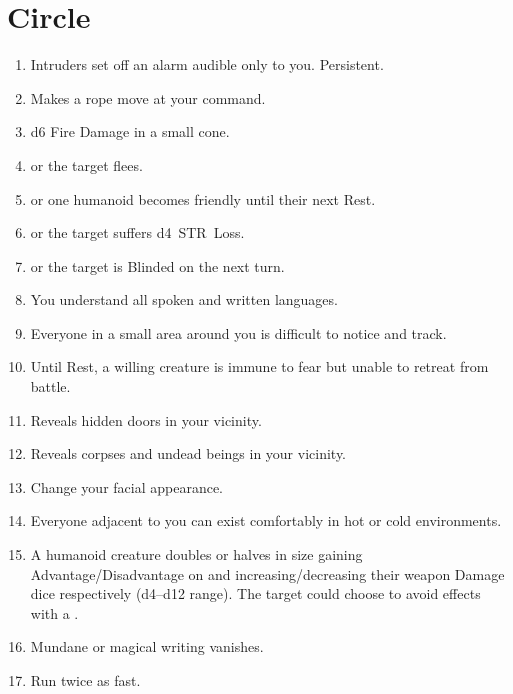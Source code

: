 \documentclass[itdr]{subfiles}
\begin{document}

\vfill
\break

\section{ Circle}
\def \spellcircle {1}
\begin{enumerate}
	\item {} Intruders set off an alarm audible only to you. Persistent.
	\item {} Makes a rope move at your command.
	\item {} d6 Fire Damage in a small cone.
	\item {}  or the target flees.
	\item {}  or one humanoid becomes friendly until their next Rest.
	\item {}  or the target suffers d4~STR~Loss.
	\item {}  or the target is Blinded on the next turn.
	\item {} You understand all spoken and written languages.
	\item {} Everyone in a small area around you is difficult to notice and track.
	\item {} Until Rest, a willing creature is immune to fear but unable to retreat from battle.
	\item {} Reveals hidden doors in your vicinity.
	\item {} Reveals corpses and undead beings in your vicinity.
	\item {} Change your facial appearance.
	\item {} Everyone adjacent to you can exist comfortably in hot or cold environments.
	\item {} A humanoid creature doubles or halves in size gaining Advantage/Disadvantage on  and increasing/decreasing their weapon Damage dice respectively (d4--d12 range). The target could choose to avoid effects with a .
	\item {} Mundane or magical writing vanishes.
	\item {} Run twice as fast.

\end{enumerate}
\end{document}
